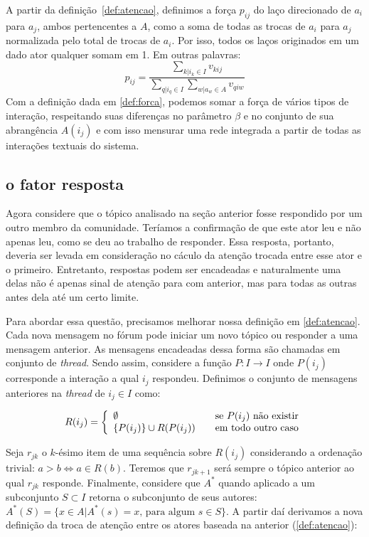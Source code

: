 \documentclass{article}
\begin{document}
A partir da definição~\ref{def:atencao}, definimos a força $p_{ij}$ do laço
direcionado de $a_i$ para $a_j$, ambos pertencentes a $A$, como a soma de todas
as trocas de $a_i$ para $a_j$ normalizada pelo total de trocas de $a_i$.
Por isso, todos os laços originados em um dado ator qualquer somam em 1. Em
outras palavras:
\begin{equation}
\label{def:forca}
p_{ij}=\frac{\sum_{k|i_k \in I}v_{kij}}{\sum_{q|i_q \in I}\sum_{w|a_w
\in A}v_{qiw}}
\end{equation}
Com a definição dada em \ref{def:forca}, podemos somar a força de vários
tipos de interação, respeitando suas diferenças no parâmetro $\beta$ e
no conjunto de sua abrangência $A(i_j)$ e com isso mensurar uma rede integrada
a partir de todas as interações textuais do sistema. 
\subsection{o fator resposta}
Agora considere que o tópico analisado na seção anterior fosse respondido por um
outro membro da comunidade. Teríamos a confirmação de que este ator leu e não
apenas leu, como se deu ao trabalho de responder. Essa resposta, portanto,
deveria ser levada em consideração no cáculo da atenção trocada entre esse ator
e o primeiro. Entretanto, respostas podem ser encadeadas e naturalmente uma
delas não é apenas sinal de atenção para com anterior, mas para todas as outras
antes dela até um certo limite.

Para abordar essa questão, precisamos melhorar nossa definição em
\ref{def:atencao}. Cada nova mensagem no fórum pode iniciar um novo tópico ou
responder a uma mensagem anterior. As mensagens encadeadas dessa forma são
chamadas em conjunto de \textit{thread}. Sendo assim, considere a função
$P:I\to I$ onde $P(i_j)$ corresponde a interação a qual $i_j$ respondeu.
Definimos o conjunto de mensagens anteriores na \textit{thread} de $i_j \in I$
como:

\begin{equation}
R(i_j) = \left\{ \begin{array}{l l} \emptyset &\quad\text{se $P(i_j)$ não
existir}\\ \{P(i_j)\} \cup R(P(i_j)) &\quad\text{em todo outro caso}\end{array}
\right.
\end{equation}

Seja $r_{jk}$ o $k$-ésimo item de uma sequência sobre $R(i_j)$ considerando a
ordenação trivial: $a > b \iff a\in R(b)$. Teremos que $r_{jk+1}$ será sempre o
tópico anterior ao qual $r_{jk}$ responde. Finalmente, considere que $A^*$
quando aplicado a um subconjunto $S \subset I$ retorna o subconjunto de seus
autores: $A^*(S)=\{x \in A| A^*(s) = x \text{, para algum }s \in S\}$. A
partir daí derivamos a nova definição da troca de atenção entre os atores baseada na anterior
(\ref{def:atencao}):
\end{document}
